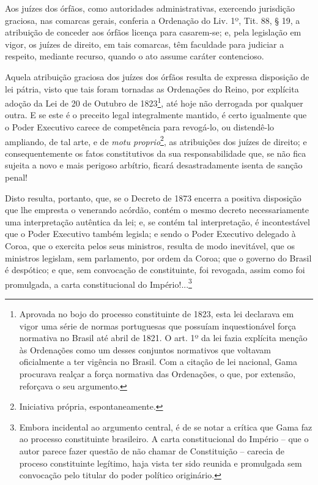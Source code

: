 Aos juízes dos órfãos, como autoridades administrativas, exercendo
jurisdição graciosa, nas comarcas gerais, conferia a Ordenação do Liv.
1º, Tit. 88, § 19, a atribuição de conceder aos órfãos licença para
casarem-se; e, pela legislação em vigor, os juízes de direito, em tais
comarcas, têm faculdade para judiciar a respeito, mediante recurso,
quando o ato assume caráter contencioso.

Aquela atribuição graciosa dos juízes dos órfãos resulta de expressa
disposição de lei pátria, visto que tais foram tornadas as Ordenações do
Reino, por explícita adoção da Lei de 20 de Outubro de 1823\footnote{Aprovada
  no bojo do processo constituinte de 1823, esta lei declarava em vigor
  uma série de normas portuguesas que possuíam inquestionável força
  normativa no Brasil até abril de 1821. O art. 1º da lei fazia
  explícita menção às Ordenações como um desses conjuntos normativos que
  voltavam oficialmente a ter vigência no Brasil. Com a citação de lei
  nacional, Gama procurava realçar a força normativa das Ordenações, o
  que, por extensão, reforçava o seu argumento.}, até hoje não derrogada
por qualquer outra. E se este é o preceito legal integralmente mantido,
é certo igualmente que o Poder Executivo carece de competência para
revogá-lo, ou distendê-lo ampliando, de tal arte, e de \emph{motu
proprio}\footnote{Iniciativa própria, espontaneamente.}, as atribuições
dos juízes de direito; e consequentemente os fatos constitutivos da sua
responsabilidade que, se não fica sujeita a novo e mais perigoso
arbítrio, ficará desastradamente isenta de sanção penal!

Disto resulta, portanto, que, se o Decreto de 1873 encerra a positiva
disposição que lhe empresta o venerando acórdão, contém o mesmo decreto
necessariamente uma interpretação autêntica da lei; e, se contém tal
interpretação, é incontestável que o Poder Executivo também legisla; e
sendo o Poder Executivo delegado à Coroa, que o exercita pelos seus
ministros, resulta de modo inevitável, que os ministros legislam, sem
parlamento, por ordem da Coroa; que o governo do Brasil é despótico; e
que, sem convocação de constituinte, foi revogada, assim como foi
promulgada, a carta constitucional do Império!...\footnote{Embora
  incidental ao argumento central, é de se notar a crítica que Gama faz
  ao processo constituinte brasileiro. A carta constitucional do Império
  -- que o autor parece fazer questão de não chamar de Constituição --
  carecia de proceso constituinte legítimo, haja vista ter sido reunida
  e promulgada sem convocação pelo titular do poder político originário.}

